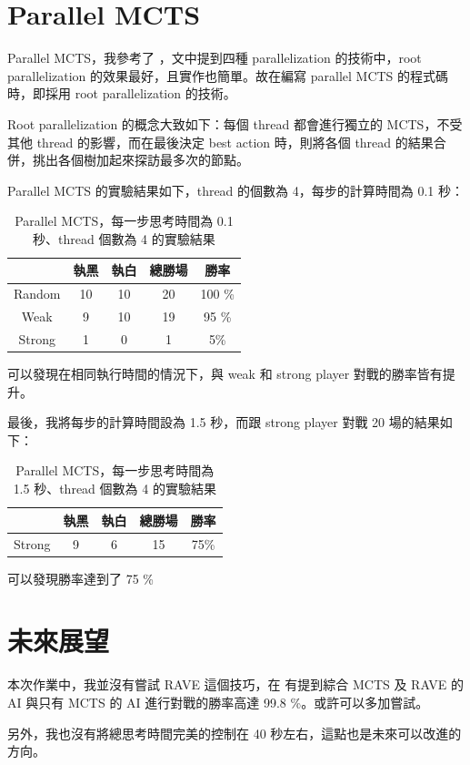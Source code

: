 \documentclass{article}[12pt]
\begin{document}
\section{Parallel MCTS}

Parallel MCTS，我參考了 \cite{5654650}，文中提到四種 parallelization 的技術中，root parallelization 的效果最好，且實作也簡單。故在編寫 parallel MCTS 的程式碼時，即採用 root parallelization 的技術。

Root parallelization 的概念大致如下：每個 thread 都會進行獨立的 MCTS，不受其他 thread 的影響，而在最後決定 best action 時，則將各個 thread 的結果合併，挑出各個樹加起來探訪最多次的節點。

Parallel MCTS 的實驗結果如下，thread 的個數為 4，每步的計算時間為 0.1 秒：


\begin{table}[H]
\centering
\caption{Parallel MCTS，每一步思考時間為 0.1 秒、thread 個數為 4 的實驗結果}
\label{tab:mcts-2}
\begin{tabular}{@{}ccccc@{}}
\toprule
       & 執黑 & 執白 & 總勝場 & 勝率     \\ \midrule
Random & 10 & 10 & 20  & 100 \% \\
Weak   & 9  & 10 & 19  & 95 \%  \\
Strong & 1  & 0  & 1   & 5\%    \\ \bottomrule
\end{tabular}
\end{table}

可以發現在相同執行時間的情況下，與 weak 和 strong player 對戰的勝率皆有提升。

最後，我將每步的計算時間設為 1.5 秒，而跟 strong player 對戰 20 場的結果如下：

\begin{table}[H]
\centering
\caption{Parallel MCTS，每一步思考時間為 1.5 秒、thread 個數為 4 的實驗結果}
\label{tab:mcts-3}
\begin{tabular}{@{}ccccc@{}}
\toprule
       & 執黑 & 執白 & 總勝場 & 勝率   \\ \midrule
Strong & 9  & 6  & 15  & 75\% \\ \bottomrule
\end{tabular}
\end{table}

可以發現勝率達到了 75 \%

\section{未來展望}

本次作業中，我並沒有嘗試 RAVE 這個技巧，在 \cite{She2013} 有提到綜合 MCTS 及 RAVE 的 AI 與只有 MCTS 的 AI 進行對戰的勝率高達 99.8 \%。或許可以多加嘗試。

另外，我也沒有將總思考時間完美的控制在 40 秒左右，這點也是未來可以改進的方向。

\printbibliography
\end{document}
